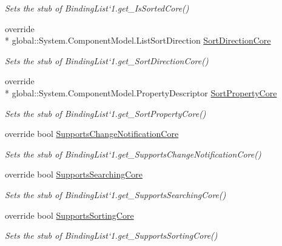 \begin{DoxyCompactItemize}
\begin{DoxyCompactList}\small\item\em Sets the stub of Binding\-List`1.get\-\_\-\-Is\-Sorted\-Core()\end{DoxyCompactList}\item 
override \\*
global\-::\-System.\-Component\-Model.\-List\-Sort\-Direction \hyperlink{class_system_1_1_component_model_1_1_fakes_1_1_stub_binding_list_3_01_t_01_4_afbe273a88a6570596ee9350b34cd4d35}{Sort\-Direction\-Core}
\begin{DoxyCompactList}\small\item\em Sets the stub of Binding\-List`1.get\-\_\-\-Sort\-Direction\-Core()\end{DoxyCompactList}\item 
override \\*
global\-::\-System.\-Component\-Model.\-Property\-Descriptor \hyperlink{class_system_1_1_component_model_1_1_fakes_1_1_stub_binding_list_3_01_t_01_4_afb31f4ffde044d55541dd46ecc44c931}{Sort\-Property\-Core}
\begin{DoxyCompactList}\small\item\em Sets the stub of Binding\-List`1.get\-\_\-\-Sort\-Property\-Core()\end{DoxyCompactList}\item 
override bool \hyperlink{class_system_1_1_component_model_1_1_fakes_1_1_stub_binding_list_3_01_t_01_4_a4ff70b9f6c4b751330bdddf418acb692}{Supports\-Change\-Notification\-Core}
\begin{DoxyCompactList}\small\item\em Sets the stub of Binding\-List`1.get\-\_\-\-Supports\-Change\-Notification\-Core()\end{DoxyCompactList}\item 
override bool \hyperlink{class_system_1_1_component_model_1_1_fakes_1_1_stub_binding_list_3_01_t_01_4_a3e2f5c7a4dfe13f180edff030fdf79a8}{Supports\-Searching\-Core}
\begin{DoxyCompactList}\small\item\em Sets the stub of Binding\-List`1.get\-\_\-\-Supports\-Searching\-Core()\end{DoxyCompactList}\item 
override bool \hyperlink{class_system_1_1_component_model_1_1_fakes_1_1_stub_binding_list_3_01_t_01_4_a2c88cfd098186618785537db19d22c0d}{Supports\-Sorting\-Core}
\begin{DoxyCompactList}\small\item\em Sets the stub of Binding\-List`1.get\-\_\-\-Supports\-Sorting\-Core()\end{DoxyCompactList}\end{DoxyCompactItemize}


